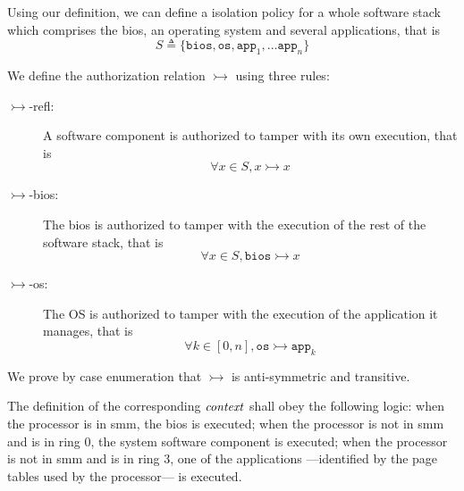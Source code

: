 %
%

\begin{example}
  \label{example:speccert:isolation}
  Using our definition, we can define a isolation policy for a whole software
  stack which comprises the \ac{bios}, an operating system and several
  applications, that is
  \[
    S \triangleq \{ \mathtt{bios}, \mathtt{os}, \mathtt{app}_1, \dots
    \mathtt{app}_n \}
  \]

  We define the authorization relation $\rightarrowtail$ using three rules:
  \begin{description}
  \item [\(\rightarrowtail\)-refl:] A software component is authorized to tamper
    with its own execution, that is
    \[ \forall x \in S, x \rightarrowtail x \]
  \item [\(\rightarrowtail\)-bios:] The \ac{bios} is authorized to tamper with
    the execution of the rest of the software stack, that is
    \[ \forall x \in S, \mathtt{bios} \rightarrowtail x \]
  \item [\(\rightarrowtail\)-os:] The OS is authorized to tamper with the
    execution of the application it manages, that is
    \[ \forall k \in [0, n], \mathtt{os} \rightarrowtail \mathtt{app}_k \]
  \end{description}

  We prove by case enumeration that $\rightarrowtail$ is anti-symmetric and
  transitive.

  The definition of the corresponding $\mathit{context}$ shall obey the following
  logic: when the processor is in \ac{smm}, the \ac{bios} is executed; when the
  processor is not in \ac{smm} and is in ring 0, the system software component
  is executed; when the processor is not in \ac{smm} and is in ring 3, one of
  the applications ---identified by the page tables used by the processor--- is
  executed.
\end{example}

